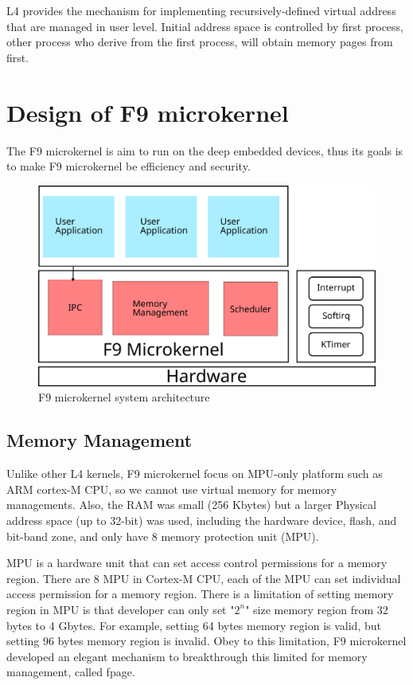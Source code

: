 \documentclass[10pt,preprint,nocopyrightspace]{sigplanconf}
\begin{document}
L4 provides the mechanism for implementing recursively-defined virtual address that are managed in user level\cite{dannowski2011l4}. Initial address space is controlled by first process, other process who derive from the first process, will obtain memory pages from first.

\section{Design of F9 microkernel}

The F9 microkernel is aim to run on the deep embedded devices, thus its goals is to make F9 microkernel be efficiency and security.

\begin{figure}[H]
	\begin{center}
		\includegraphics[width=\linewidth]{picture/f9_arch.png}
	\end{center}
	\caption{F9 microkernel system architecture}
	\label{fig:f9}
\end{figure}

\subsection{Memory Management}

Unlike other L4 kernels, F9 microkernel focus on MPU-only platform such as ARM cortex-M CPU, so we cannot use virtual memory for memory managements. Also, the RAM was small (256 Kbytes) but a larger Physical address space (up to 32-bit) was used, including the hardware device, flash, and bit-band zone, and only have 8 memory protection unit (MPU)\cite{arm2016mpu,yiu2013definitive,st2016managing,usna2015l18}.

MPU is a hardware unit that can set access control permissions for a memory region. There are 8 MPU in Cortex-M CPU, each of the MPU can set individual access permission for a memory region. There is a limitation of setting memory region in MPU is that developer can only set "$2^n$" size memory region from 32 bytes to 4 Gbytes\cite{yiu2013definitive,st2016managing}. For example, setting 64 bytes memory region is valid, but setting 96 bytes memory region is invalid. Obey to this limitation, F9 microkernel developed an elegant mechanism to breakthrough this limited for memory management, called fpage.
\end{document}
